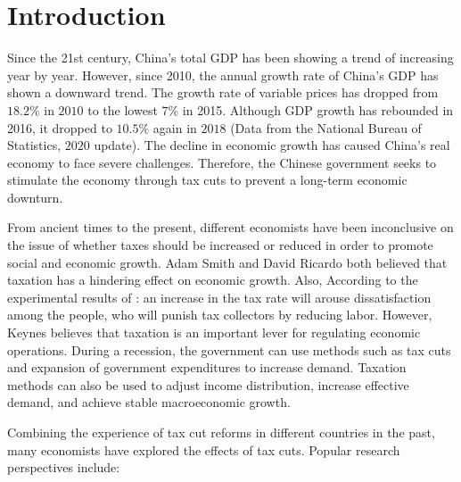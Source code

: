 \documentclass[3p,times]{elsarticle}
\begin{document}

\section{Introduction}
\label{intro}

Since the 21st century, China's total GDP has been showing a trend of increasing year by year. However, since 2010, the annual growth rate of China’s GDP has shown a downward trend. The growth rate of variable prices has dropped from $18.2\%$ in $2010$ to the lowest $7\%$ in 2015. Although GDP growth has rebounded in 2016, it dropped to $10.5\%$ again in $2018$ (Data from the National Bureau of Statistics, $2020$ update). The decline in economic growth has caused China's real economy to face severe challenges. Therefore, the Chinese government seeks to stimulate the economy through tax cuts to prevent a long-term economic downturn.

From ancient times to the present, different economists have been inconclusive on the issue of whether taxes should be increased or reduced in order to promote social and economic growth. Adam Smith and David Ricardo both believed that taxation has a hindering effect on economic growth. Also, According to the experimental results of \citet{levy2009behavioral}: an increase in the tax rate will arouse dissatisfaction among the people, who will punish tax collectors by reducing labor. However, Keynes believes that taxation is an important lever for regulating economic operations. During a recession, the government can use methods such as tax cuts and expansion of government expenditures to increase demand. Taxation methods can also be used to adjust income distribution, increase effective demand, and achieve stable macroeconomic growth.

Combining the experience of tax cut reforms in different countries in the past, many economists have explored the effects of tax cuts. Popular research perspectives include:
\end{document}
